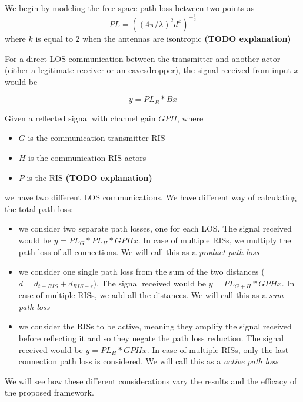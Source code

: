 We begin by modeling the free space path loss \cite{Free_space_path_loss} between two points as
\begin{equation}
  PL = ((4 \pi / \lambda)^2 d^k)^{-\frac{1}{2}}
\end{equation}
where $k$ is equal to $2$ when the antennas are isontropic \textbf{(TODO explanation)}

For a direct LOS communication between the transmitter and another actor (either a legitimate receiver or an eavesdropper), the signal received from input $x$ would be

\begin{equation}
  y = PL_B * Bx
\end{equation}

Given a reflected signal with channel gain $GPH$, where
\begin{itemize}
  \item $G$ is the communication transmitter-RIS
  \item $H$ is the communication RIS-actors
  \item $P$ is the RIS \textbf{(TODO explanation)}
\end{itemize}
we have two different LOS communications. We have different way of calculating the total path loss:
\begin{itemize}
  \item we consider two separate path losses, one for each LOS. The signal received would be $y = PL_G * PL_H * GPHx$. In case of multiple RISs, we multiply the path loss of all connections. We will call this as a \textit{product path loss}
  \item we consider one single path loss from the sum of the two distances ($d = d_{t-RIS} + d_{RIS-r}$). The signal received would be $y = PL_{G+H} * GPHx$. In case of multiple RISs, we add all the distances. We will call this as a \textit{sum path loss}
  \item we consider the RISs to be active, meaning they amplify the signal received before reflecting it and so they negate the path loss reduction. The signal received would be $y = PL_H * GPHx$. In case of multiple RISs, only the last connection path loss is considered. We will call this as a \textit{active path loss}
\end{itemize}

We will see how these different considerations vary the results and the efficacy of the proposed framework.

